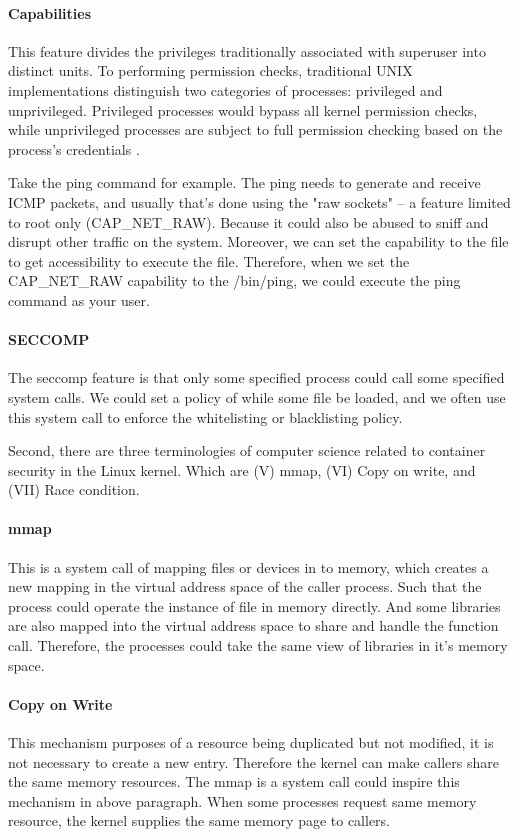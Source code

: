 \documentclass[12pt,a4paper]{article}
\begin{document}
\paragraph{Capabilities}
This feature divides the privileges traditionally associated with superuser into
distinct units. To performing permission checks, traditional UNIX
implementations distinguish two categories of processes: privileged and unprivileged.
Privileged processes would bypass all kernel permission checks, while unprivileged
processes are subject to full permission checking based on the process's credentials
\cite{capabilities}.

Take the ping command for example. The ping needs to generate and receive ICMP packets,
and usually that's done using the "raw sockets" – a feature limited to root only
(CAP\_NET\_RAW). Because it could also be abused to sniff and disrupt other traffic
on the system. Moreover, we can set the capability to the file to get accessibility
to execute the file.
Therefore, when we set the CAP\_NET\_RAW capability to the /bin/ping, we could execute
the ping command as your user.

\paragraph{SECCOMP}
The seccomp feature is that only some specified process could call some specified
system calls. We could set a policy of while some file be loaded, and we often use
this system call to enforce the whitelisting or blacklisting policy.

Second, there are three terminologies of computer science related to container
security in the Linux kernel. Which are (\RN{5}) mmap, (\RN{6}) Copy on write,
and (\RN{7}) Race condition.

\paragraph{mmap}
This is a system call of mapping files or devices in to memory, which creates a
new mapping in the virtual address space of the caller process. Such that
the process could operate the instance of file in memory directly.
And some libraries are also mapped into the virtual address space to share and handle
the function call. Therefore, the processes could take the same view of libraries in
it's memory space.

\paragraph{Copy on Write}
This mechanism purposes of a resource being duplicated but not modified, it is not
necessary to create a new entry. Therefore the kernel can make callers share
the same memory resources. The mmap is a system call could inspire this mechanism
in above paragraph. When some processes request same memory resource, the kernel
supplies the same memory page to callers.
\end{document}
